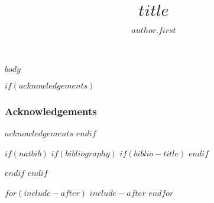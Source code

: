 \documentclass[defaultstyle,11pt]{comps}
\title{$title$}
\author{$author.first$}{$author.last$}
\begin{document}
$body$


\newpage
$if(acknowledgements)$
\subsubsection*{Acknowledgements}
{\small $acknowledgements$}
$endif$


$if(natbib)$
$if(bibliography)$
$if(biblio-title)$
\renewcommand\refname{$biblio-title$}
$endif$

$endif$
$endif$


$for(include-after)$
$include-after$
$endfor$
\end{document}
